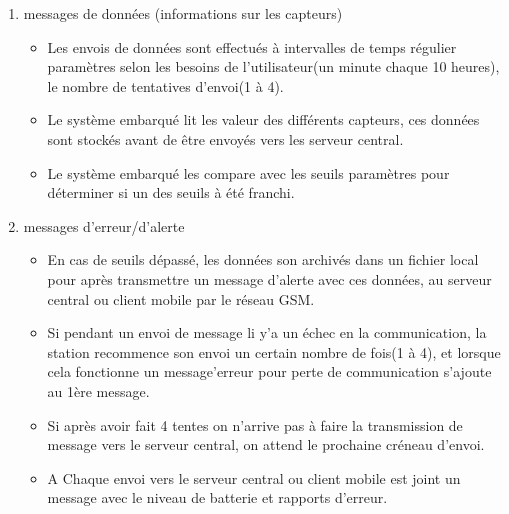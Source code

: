 \documentclass [a4paper] {report}
\begin{document}
\begin{description}
\begin{enumerate}
	\item messages de données (informations sur les capteurs)\\
		\begin{itemize}
		\item Les envois de données sont effectués à intervalles de temps régulier paramètres selon les besoins de l'utilisateur(un minute chaque 10 heures), le nombre de tentatives d'envoi(1 à 4).\\
		\item Le système embarqué lit les valeur des différents capteurs, ces données sont stockés avant de être envoyés vers les serveur central.\\
		\item Le système embarqué les compare avec les seuils paramètres pour déterminer si un des seuils à été franchi. \\
		\end{itemize}

	\item messages d'erreur/d'alerte\\
		\begin{itemize}
		\item En cas de seuils dépassé, les données son archivés dans un fichier local pour après  transmettre un message d'alerte avec ces données, au serveur central ou client mobile par le réseau GSM. \\
		\item Si pendant un envoi de message li y'a un échec en la communication, la station recommence son envoi un certain nombre de fois(1 à 4), et lorsque cela fonctionne un message'erreur pour perte de communication s'ajoute au 1ère message.\\
		\item Si après avoir fait 4 tentes on n'arrive pas à faire la transmission de message vers le serveur central, on attend le prochaine créneau d'envoi.\\
		\item A Chaque envoi vers le serveur central ou client mobile est joint un message avec le niveau de batterie et rapports d'erreur.\\
		\end{itemize}\hfill\\
	\end{enumerate}


\end{description}
\end{document}
